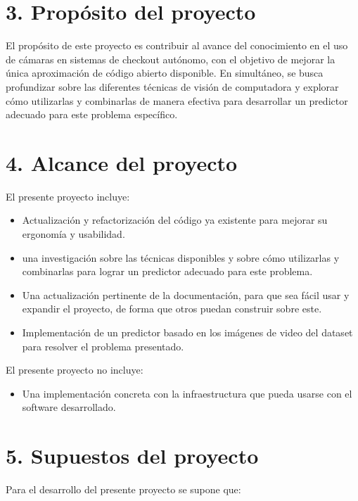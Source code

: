 \documentclass[
11pt, %
]{charter}
\begin{document}
\section{3. Propósito del proyecto}
\label{sec:proposito}

El propósito de este proyecto es contribuir al avance del conocimiento en el uso de cámaras en sistemas de checkout autónomo, con el objetivo de mejorar la única aproximación de código abierto disponible. En simultáneo, se busca profundizar sobre las diferentes técnicas de visión de computadora y explorar cómo utilizarlas y combinarlas de manera efectiva para desarrollar un predictor adecuado para este problema específico.

\section{4. Alcance del proyecto}
\label{sec:alcance}

El presente proyecto incluye:
\begin{itemize}

\item Actualización y refactorización del código ya existente para mejorar su ergonomía y usabilidad.
\item una investigación sobre las técnicas disponibles y sobre cómo utilizarlas y combinarlas para lograr un predictor adecuado para este problema.
\item Una actualización pertinente de la documentación, para que sea fácil usar y expandir el proyecto, de forma que otros puedan construir sobre este.
\item Implementación de un predictor basado en los imágenes de video del dataset para resolver el problema presentado.
\end{itemize}

El presente proyecto no incluye:
\begin{itemize}
\item Una implementación concreta con la infraestructura que pueda usarse con el software desarrollado.
\end{itemize}


\section{5. Supuestos del proyecto}
\label{sec:supuestos}

Para el desarrollo del presente proyecto se supone que:
\end{document}
